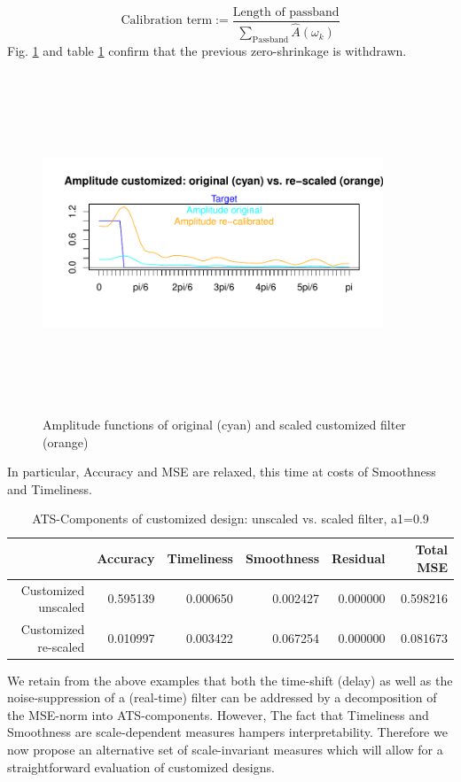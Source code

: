 \documentclass[a4paper]{book}
\begin{document}
\[
\textrm{Calibration~term}:=\frac{\textrm{Length~of~passband}}{\sum_{\textrm{Passband}}\hat{A}(\omega_k)}
\]
Fig. \ref{z_box_plot_amp_and_shift_cust_ST_1_scaled_unscaled} and table \ref{ats_comp_dfa_ST_1_scaled_unscaled} confirm that the previous zero-shrinkage is withdrawn.
\begin{figure}[H]\begin{center}\includegraphics[height=4in, width=4in]{z_box_plot_amp_and_shift_cust_ST_1_scaled_unscaled}\caption{Amplitude functions of original (cyan) and scaled customized filter (orange)\label{z_box_plot_amp_and_shift_cust_ST_1_scaled_unscaled}}\end{center}\end{figure}In particular, Accuracy and MSE are relaxed, this time at costs of Smoothness and Timeliness.  
\begin{table}[ht]
\centering
\begin{tabular}{rrrrrr}
  \hline
 & Accuracy & Timeliness & Smoothness & Residual & Total MSE \\ 
  \hline
Customized unscaled & 0.595139 & 0.000650 & 0.002427 & 0.000000 & 0.598216 \\ 
  Customized re-scaled & 0.010997 & 0.003422 & 0.067254 & 0.000000 & 0.081673 \\ 
   \hline
\end{tabular}
\caption{ATS-Components of customized design: unscaled vs. scaled filter, a1=0.9} 
\label{ats_comp_dfa_ST_1_scaled_unscaled}
\end{table}We retain from the above examples that both the time-shift (delay) as well as the noise-suppression of a (real-time) filter can be addressed by a decomposition of the MSE-norm into ATS-components. However, The fact that Timeliness and Smoothness are scale-dependent measures hampers interpretability. Therefore we now propose an alternative set of scale-invariant measures which will allow for a straightforward evaluation of customized designs. 
\end{document}

